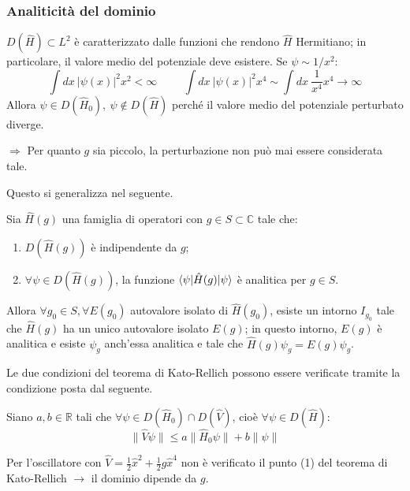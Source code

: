 \documentclass[10pt]{beamer}
\begin{document}
   \begin{frame}
	   \frametitle{Analiticit\`a del dominio}
	   $D(\hat{H}) \subset L^2$ \`e caratterizzato dalle funzioni che rendono $\hat{H}$ Hermitiano; in particolare, il valore medio del potenziale deve esistere.
	   Se $\psi \sim 1/x^2$:
	   \begin{equation*}
	   	\int dx \ \lvert \psi (x) \rvert ^2 x^2 < \infty \hspace{1cm} \int dx\ \lvert \psi (x) \rvert ^2 x^4 \sim \int dx\  \frac{1}{x^4}x^4 \to \infty
	   \end{equation*}
	   Allora $\psi \in D(\hat{H}_0),\ \psi \not \in D(\hat{H})$ perch\'e il valore medio del potenziale perturbato diverge.

	   $\Rightarrow $ Per quanto $g$ sia piccolo, la perturbazione non pu\`o mai essere considerata tale.

	   Questo si generalizza nel seguente.
	   \begin{theorem}
		   Sia $\hat{H}(g)$ una famiglia di operatori con $g \in S \subset \mathbb{C}$ tale che:
		   \begin{enumerate}[1]
		   	\item $D(\hat{H}(g))$ \`e indipendente da $g$;
			\item $\forall \psi \in D(\hat{H}(g))$, la funzione $\braket{\psi |\hat{H}(g)|\psi } $ \`e analitica per $g \in S$.
		   \end{enumerate}  
		   Allora $\forall g_0\in S, \forall E(g_0)$ autovalore isolato di $\hat{H}(g_0)$, esiste un intorno $I_{g_0} $ tale che $\hat{H}(g)$ ha un unico autovalore isolato $E(g)$; in questo intorno, $E(g)$ \`e analitica e esiste $\psi _g$ anch'essa analitica e tale che $\hat{H}(g) \psi _g = E(g) \psi _g$.
	   \end{theorem}
   \end{frame} 
   \begin{frame}
	   Le due condizioni del teorema di Kato-Rellich possono essere verificate tramite la condizione posta dal seguente.
   	\begin{theorem}
Siano $a,b \in \mathbb{R}$ tali che $\forall \psi \in D(\hat{H}_0) \cap D(\hat{V})$, cio\`e $\forall \psi  \in D(\hat{H})$:
\begin{equation*}
	\lVert \hat{V}\psi  \rVert \le  a \lVert \hat{H}_0 \psi  \rVert + b \lVert \psi  \rVert 
\end{equation*}
   	\end{theorem}
	Per l'oscillatore con $\hat{V} = \frac{1}{2} \hat{x}^2 + \frac{1}{2}g \hat{x}^4$ non \`e verificato il punto (1) del teorema di Kato-Rellich $\longrightarrow$ il dominio dipende da $g$.
   \end{frame}
\end{document}
